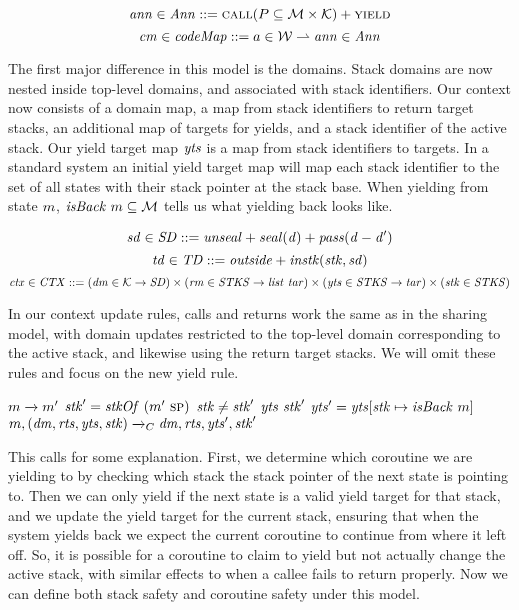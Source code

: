 \documentclass[acmsmall,review,anonymous]{acmart}\settopmatter{printfolios=true,printccs=false,printacmref=false}
\newcommand*{\rsp}{\textsc{sp}}
\begin{document}
\[\mathit{ann} \in \mathit{Ann} ::= \text{\sc call}(P \subseteq {\mathcal M} \times {\mathcal K}) + \text{\sc yield}\]
\[\mathit{cm} \in \mathit{codeMap} ::= a \in {\mathcal W} \rightharpoonup \mathit{ann} \in \mathit{Ann}\]

The first major difference in this model is the domains. Stack domains are now nested inside
top-level domains, and associated with stack identifiers.
Our context now consists of a domain map, a map from stack identifiers to return target stacks,
an additional map of targets for yields, and a stack identifier of the active stack.
Our yield target map \(\mathit{yts}\) is a map from stack identifiers to targets.
In a standard system an initial yield target map will map each stack identifier to the
set of all states with their stack pointer at the stack base. When yielding from state \(m\),
\(\mathit{isBack} ~ m \subseteq {\mathcal M}\) tells us what yielding back looks like.

\[\mathit{sd} \in \mathit{SD} ::= \mathit{unseal} + \mathit{seal(d)} + \mathit{pass(d-d')}\]
\[\mathit{td} \in \mathit{TD} ::= \mathit{outside} + \mathit{instk}(\mathit{stk},\mathit{sd})\]
\[\mathit{ctx} \in \mathit{CTX} ::= (\mathit{dm} \in {\mathcal K} \rightarrow \mathit{SD}) \times
(\mathit{rm} \in \mathit{STKS} \rightarrow \mathit{list} ~ \mathit{tar}) \times (\mathit{yts} \in \mathit{STKS} \rightarrow
\mathit{tar}) \times (\mathit{stk} \in \mathit{STKS})\]

In our context update rules, calls and returns work the same as in the sharing model,
with domain updates restricted to the top-level domain corresponding to the active stack,
and likewise using the return target stacks. We will omit these rules and focus on the new yield rule.

\judgmentthreebr[ Yield]
                {\(\codemap ~ (\mach ~ \PCname) = \yieldmap\)}
                {\(m \xrightarrow{} m'\)}
                {\(\stackid' = \stackof ~ (\mach'~ \rsp)\)}
                {\(\mathit{stk} \not = \mathit{stk}'\)}
                {\(\mathit{yts} ~ \mathit{stk}'\)}
                {\(\mathit{yts}' = \mathit{yts}[\mathit{stk} \mapsto \mathit{isBack} ~ m]\)}
                {\(m,(\mathit{dm},\mathit{rts},\mathit{yts},\mathit{stk}) \xrightarrow{}_C \mathit{dm},\mathit{rts},\mathit{yts}',\mathit{stk}'\)}

This calls for some explanation. First, we determine which coroutine we are yielding to by
checking which stack the stack pointer of the next state is pointing to. Then we can only yield
if the next state is a valid yield target for that stack, and we update the yield target for
the current stack, ensuring that when the system yields back we expect the current coroutine
to continue from where it left off. So, it is possible for a coroutine to claim to yield
but not actually change the active stack, with similar effects to when a callee fails
to return properly. Now we can define both stack safety and coroutine safety under this model.
\end{document}
